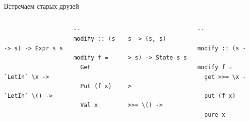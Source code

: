     \begin{frame}[fragile]{Встречаем старых друзей}
        \vspace{-1em}
        \begin{columns}[onlytextwidth]
            \begin{column}[t]{0.485\textwidth}
                \begin{verbatim}
                    --
                    modify :: (s -> s) -> Expr s s
                    modify f =
                      Get `LetIn` \x ->
                      Put (f x) `LetIn` \() ->
                      Val x
                \end{verbatim}
            \end{column}\hfill%
            \begin{column}[t]{0.485\textwidth}
                \begin{verbatim}
                    --                    s -> (s, s)
                    modify :: (s -> s) -> State s s
                    modify f =
                      get >>= \x ->
                      put (f x) >>= \() ->
                      pure x
                \end{verbatim}
            \end{column}
        \end{columns}
    \end{frame}

